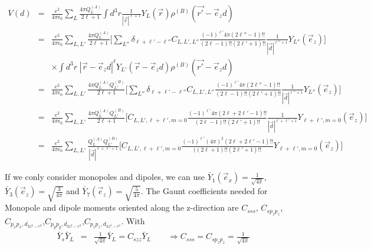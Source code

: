 \documentclass[11pt,a4paper]{report}
\begin{document}
\begin{eqnarray*}
V(d)&=& 
\frac{e^2}{4\pi\epsilon_0} \sum_L \frac{4\pi Q_L^{(A)}}{2\ell+1} 
\int d^3r \frac{1}{|\vec{r}|^{\ell+1}}Y_L(\vec{r})\rho^{(B)}(\vec{r'}-\vec{e}_z d)
\\
&=&
\frac{e^2}{4\pi\epsilon_0} \sum_{L,L'} \frac{4\pi Q_L^{(A)}}{2\ell+1} 
\biggl[\sum_{L''}\delta_{\ell+\ell'-\ell''}C_{L,L',L''}
\frac{(-1)^{\ell'}4\pi(2\ell''-1)!!}{(2\ell-1)!!(2\ell'+1)!!}
\frac{1}{|\vec{d}|^{\ell''+1}}Y_{L''}(\vec{e}_z)
\biggr]
\\
&&\times
\int d^3r\;|\vec{r}-\vec{e}_zd|^{\ell}Y_{L'}(\vec{r}-\vec{e}_zd)\rho^{(B)}(\vec{r'}-\vec{e}_z d)
\\
&=&
\frac{e^2}{4\pi\epsilon_0} \sum_{L,L'} \frac{4\pi Q_L^{(A)}Q_{L'}^{(B)}}{2\ell+1} 
\biggl[\sum_{L''}\delta_{\ell+\ell'-\ell''}C_{L,L',L''}
\frac{(-1)^{\ell'}4\pi(2\ell''-1)!!}{(2\ell-1)!!(2\ell'+1)!!}
\frac{1}{|\vec{d}|^{\ell''+1}}Y_{L''}(\vec{e}_z)
\biggr]
\\
&=&
\frac{e^2}{4\pi\epsilon_0} \sum_{L,L'} \frac{4\pi Q_L^{(A)}Q_{L'}^{(B)}}{2\ell+1} 
\biggl[C_{L,L',\ell+\ell',m=0}
\frac{(-1)^{\ell'}4\pi(2\ell+2\ell'-1)!!}{(2\ell-1)!!(2\ell'+1)!!}
\frac{1}{|\vec{d}|^{\ell+\ell'+1}}Y_{\ell+\ell',m=0}(\vec{e}_z)
\biggr]
\\
&=&
\frac{e^2}{4\pi\epsilon_0} \sum_{L,L'} \frac{ Q_L^{(A)}Q_{L'}^{(B)}}{|\vec{d}|^{\ell+\ell'+1}}
\biggl[C_{L,L',\ell+\ell',m=0}
\frac{(-1)^{\ell'}(4\pi)^2(2\ell+2\ell'-1)!!}{((2\ell+1)!!(2\ell'+1)!!}
Y_{\ell+\ell',m=0}(\vec{e}_z)
\biggr]
\end{eqnarray*}

If we conly consider monopoles and dipoles, we can use
$\bar{Y}_1(\vec{e}_x)=\frac{1}{\sqrt{4\pi}}$,
  $\bar{Y}_3(\vec{e}_z)=\sqrt{\frac{3}{4\pi}}$ and
  $\bar{Y}_7(\vec{e}_z)=\sqrt{\frac{5}{4\pi}}$.
The Gaunt coefficients needed for Monopole and dipole moments oriented along the z-direction are
$C_{sss}$, $C_{sp_zp_z}$, $C_{p_xp_x,d_{3z^2-r^2}}$,$C_{p_yp_y,d_{3z^2-r^2}}$,$C_{p_zp_z,d_{3z^2-r^2}}$.
With
\begin{eqnarray*}
\bar{Y}_s\bar{Y}_{L}&=&\frac{1}{\sqrt{4\pi}}\bar{Y}_L=C_{szz}\bar{Y}_L\qquad\Rightarrow C_{sss}=C_{sp_zp_z}=\frac{1}{\sqrt{4\pi}}
\end{eqnarray*}
\end{document}
